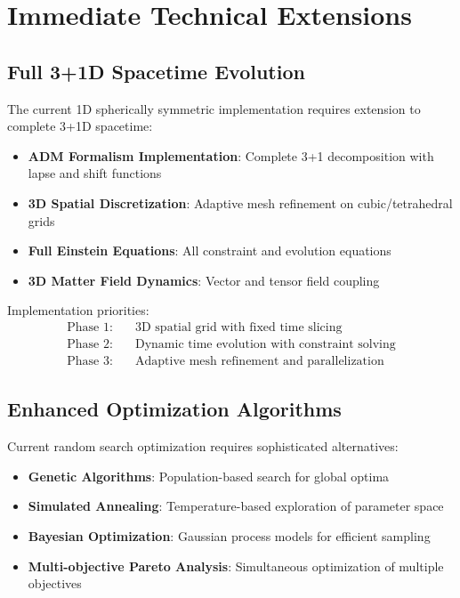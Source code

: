 \documentclass[11pt]{article}
\begin{document}
\section{Immediate Technical Extensions}

\subsection{Full 3+1D Spacetime Evolution}

The current 1D spherically symmetric implementation requires extension to complete 3+1D spacetime:

\begin{itemize}
\item \textbf{ADM Formalism Implementation}: Complete 3+1 decomposition with lapse and shift functions
\item \textbf{3D Spatial Discretization}: Adaptive mesh refinement on cubic/tetrahedral grids
\item \textbf{Full Einstein Equations}: All constraint and evolution equations
\item \textbf{3D Matter Field Dynamics}: Vector and tensor field coupling
\end{itemize}

Implementation priorities:
\begin{align}
\text{Phase 1:} &\quad \text{3D spatial grid with fixed time slicing} \\
\text{Phase 2:} &\quad \text{Dynamic time evolution with constraint solving} \\
\text{Phase 3:} &\quad \text{Adaptive mesh refinement and parallelization}
\end{align}

\subsection{Enhanced Optimization Algorithms}

Current random search optimization requires sophisticated alternatives:

\begin{itemize}
\item \textbf{Genetic Algorithms}: Population-based search for global optima
\item \textbf{Simulated Annealing}: Temperature-based exploration of parameter space
\item \textbf{Bayesian Optimization}: Gaussian process models for efficient sampling
\item \textbf{Multi-objective Pareto Analysis}: Simultaneous optimization of multiple objectives
\end{itemize}
\end{document}
